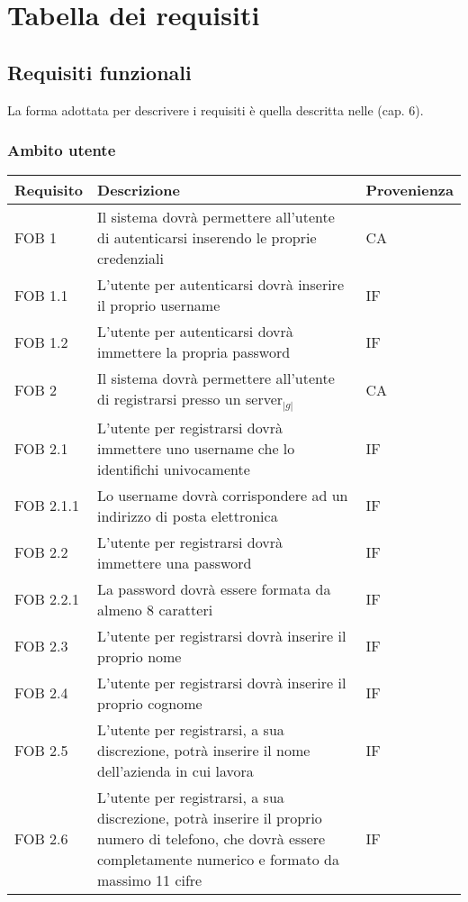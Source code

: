 \section{Tabella dei requisiti}
\subsection{Requisiti funzionali}
La forma adottata per descrivere i requisiti è quella descritta nelle \emph{\NormeDiProgetto} (cap. 6).
\\
\subsubsection{Ambito utente}
\begin{longtable}{p{} p{} p{} }
\rowcolors{2}{light}{}
\textbf{Requisito} & \textbf{Descrizione} & \textbf{Provenienza} \\
\midrule

\midrule
FOB 1 & Il sistema dovrà permettere all'utente di autenticarsi inserendo le proprie credenziali & CA\\
\midrule
FOB 1.1 & L'utente per autenticarsi dovrà inserire il proprio username & IF\\
\midrule
FOB 1.2 & L'utente per autenticarsi dovrà immettere la propria password & IF\\

\midrule
FOB 2 & Il sistema dovrà permettere all'utente di registrarsi presso un server$_{|g|}$ & CA\\
\midrule
FOB 2.1 & L'utente per registrarsi dovrà immettere uno username che lo identifichi univocamente & IF\\
\midrule
FOB 2.1.1 & Lo username dovrà corrispondere ad un indirizzo di posta elettronica & IF\\
\midrule
FOB 2.2 & L'utente per registrarsi dovrà immettere una password & IF\\
\midrule
FOB 2.2.1 & La password dovrà essere formata da almeno 8 caratteri & IF\\
\midrule
FOB 2.3 & L'utente per registrarsi dovrà inserire il proprio nome & IF\\
\midrule
FOB 2.4 & L'utente per registrarsi dovrà inserire il proprio cognome & IF\\
\midrule
FOB 2.5 & L'utente per registrarsi, a sua discrezione, potrà inserire il nome dell'azienda in cui lavora & IF\\
\midrule
FOB 2.6 & L'utente per registrarsi, a sua discrezione, potrà inserire il proprio numero di telefono, che dovrà essere completamente numerico e formato da massimo 11 cifre & IF\\


\end{longtable}
